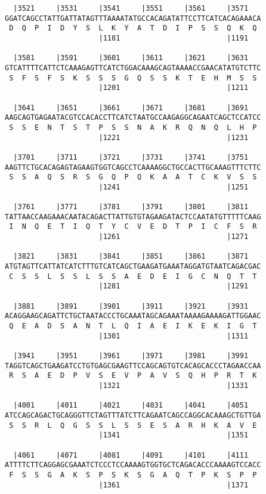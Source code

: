 \documentclass{article}
\begin{document}
\begin{Verbatim}
  |3521     |3531     |3541     |3551     |3561     |3571   
GGATCAGCCTATTGATTATAGTTTAAAATATGCCACAGATATTCCTTCATCACAGAAACA
 D  Q  P  I  D  Y  S  L  K  Y  A  T  D  I  P  S  S  Q  K  Q 
                      |1181                         |1191   
  
  |3581     |3591     |3601     |3611     |3621     |3631   
GTCATTTTCATTCTCAAAGAGTTCATCTGGACAAAGCAGTAAAACCGAACATATGTCTTC
 S  F  S  F  S  K  S  S  S  G  Q  S  S  K  T  E  H  M  S  S 
                      |1201                         |1211   
  
  |3641     |3651     |3661     |3671     |3681     |3691   
AAGCAGTGAGAATACGTCCACACCTTCATCTAATGCCAAGAGGCAGAATCAGCTCCATCC
 S  S  E  N  T  S  T  P  S  S  N  A  K  R  Q  N  Q  L  H  P 
                      |1221                         |1231   
  
  |3701     |3711     |3721     |3731     |3741     |3751   
AAGTTCTGCACAGAGTAGAAGTGGTCAGCCTCAAAAGGCTGCCACTTGCAAAGTTTCTTC
 S  S  A  Q  S  R  S  G  Q  P  Q  K  A  A  T  C  K  V  S  S 
                      |1241                         |1251   
  
  |3761     |3771     |3781     |3791     |3801     |3811   
TATTAACCAAGAAACAATACAGACTTATTGTGTAGAAGATACTCCAATATGTTTTTCAAG
 I  N  Q  E  T  I  Q  T  Y  C  V  E  D  T  P  I  C  F  S  R 
                      |1261                         |1271   
  
  |3821     |3831     |3841     |3851     |3861     |3871   
ATGTAGTTCATTATCATCTTTGTCATCAGCTGAAGATGAAATAGGATGTAATCAGACGAC
 C  S  S  L  S  S  L  S  S  A  E  D  E  I  G  C  N  Q  T  T 
                      |1281                         |1291   
  
  |3881     |3891     |3901     |3911     |3921     |3931   
ACAGGAAGCAGATTCTGCTAATACCCTGCAAATAGCAGAAATAAAAGAAAAGATTGGAAC
 Q  E  A  D  S  A  N  T  L  Q  I  A  E  I  K  E  K  I  G  T 
                      |1301                         |1311   
  
  |3941     |3951     |3961     |3971     |3981     |3991   
TAGGTCAGCTGAAGATCCTGTGAGCGAAGTTCCAGCAGTGTCACAGCACCCTAGAACCAA
 R  S  A  E  D  P  V  S  E  V  P  A  V  S  Q  H  P  R  T  K 
                      |1321                         |1331   
  
  |4001     |4011     |4021     |4031     |4041     |4051   
ATCCAGCAGACTGCAGGGTTCTAGTTTATCTTCAGAATCAGCCAGGCACAAAGCTGTTGA
 S  S  R  L  Q  G  S  S  L  S  S  E  S  A  R  H  K  A  V  E 
                      |1341                         |1351   
  
  |4061     |4071     |4081     |4091     |4101     |4111   
ATTTTCTTCAGGAGCGAAATCTCCCTCCAAAAGTGGTGCTCAGACACCCAAAAGTCCACC
 F  S  S  G  A  K  S  P  S  K  S  G  A  Q  T  P  K  S  P  P 
                      |1361                         |1371   
  

\end{Verbatim}
\end{document}
